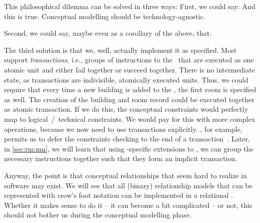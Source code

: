 This philosophical dilemma can be solved in three ways:
First, we could say:
\emph{}
And this is true.
Conceptual modelling should be technology-agnostic.

Second, we could say, maybe even as a corollary of the above, that:
\emph{}

The third solution is that we, well, actually implement it as specified.
Most  support \emph{transactions}, i.e., groups of instructions to the \dbms\ that are executed as one atomic unit and either fail together or succeed together.
There is no intermediate state, as transactions are indivisible, atomically executed units.
Thus, we could require that every time a new building is added to the \db, the first room is specified as well.
The creation of the building and room record could be executed together as atomic transaction.
If we do this, the conceptual constraints would perfectly map to logical~/~technical constraints.
We would pay for this with more complex operations, because we now need to use transactions explicitly.
\postgresql, for example, permits us to defer the constraints checking to the end of a transaction~\cite{PGDG:PD:SC:SC,N2016SSFA:DC}.
Later, in \cref{sec:rm:mn}, we will learn that using \postgresql-specific extensions to \sql, we can group the necessary instructions together such that they form an implicit transaction.

Anyway, the point is that conceptual relationships that seem hard to realize in software may exist.
We will see that all (binary) relationship models that can be represented with crow's foot notation can be implemented in a relational \dbms.
Whether it makes sense to do it -- it can become a bit complicated -- or not, this should not bother us during the conceptual modelling phase.

